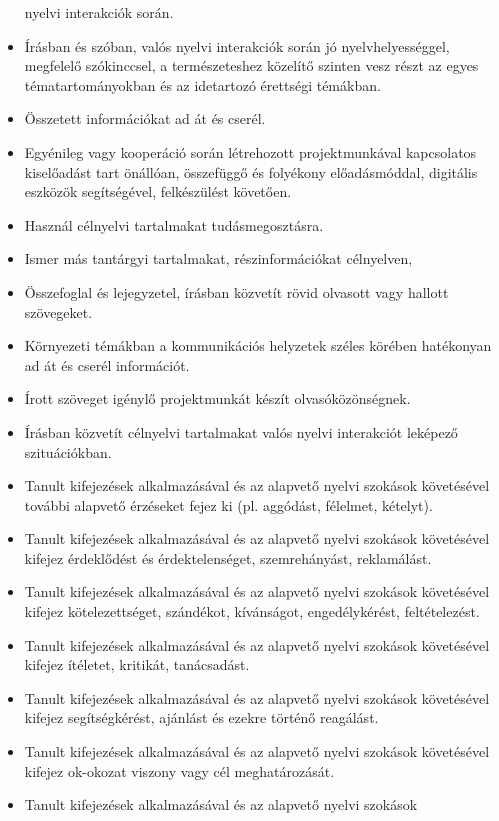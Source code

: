 \begin{itemize}
  nyelvi interakciók során.
\item
  Írásban és szóban, valós nyelvi interakciók során jó
  nyelvhelyességgel, megfelelő szókinccsel, a természeteshez közelítő
  szinten vesz részt az egyes tématartományokban és az idetartozó
  érettségi témákban.
\item
  Összetett információkat ad át és cserél.
\item
  Egyénileg vagy kooperáció során létrehozott projektmunkával
  kapcsolatos kiselőadást tart önállóan, összefüggő és folyékony
  előadásmóddal, digitális eszközök segítségével, felkészülést követően.
\item
  Használ célnyelvi tartalmakat tudásmegosztásra.
\item
  Ismer más tantárgyi tartalmakat, részinformációkat célnyelven,
\item
  Összefoglal és lejegyzetel, írásban közvetít rövid olvasott vagy
  hallott szövegeket.
\item
  Környezeti témákban a kommunikációs helyzetek széles körében
  hatékonyan ad át és cserél információt.
\item
  Írott szöveget igénylő projektmunkát készít olvasóközönségnek.
\item
  Írásban közvetít célnyelvi tartalmakat valós nyelvi interakciót
  leképező szituációkban.
\item
  Tanult kifejezések alkalmazásával és az alapvető nyelvi szokások
  követésével további alapvető érzéseket fejez ki (pl. aggódást,
  félelmet, kételyt).
\item
  Tanult kifejezések alkalmazásával és az alapvető nyelvi szokások
  követésével kifejez érdeklődést és érdektelenséget, szemrehányást,
  reklamálást.
\item
  Tanult kifejezések alkalmazásával és az alapvető nyelvi szokások
  követésével kifejez kötelezettséget, szándékot, kívánságot,
  engedélykérést, feltételezést.
\item
  Tanult kifejezések alkalmazásával és az alapvető nyelvi szokások
  követésével kifejez ítéletet, kritikát, tanácsadást.
\item
  Tanult kifejezések alkalmazásával és az alapvető nyelvi szokások
  követésével kifejez segítségkérést, ajánlást és ezekre történő
  reagálást.
\item
  Tanult kifejezések alkalmazásával és az alapvető nyelvi szokások
  követésével kifejez ok-okozat viszony vagy cél meghatározását.
\item
  Tanult kifejezések alkalmazásával és az alapvető nyelvi szokások

\end{itemize}
